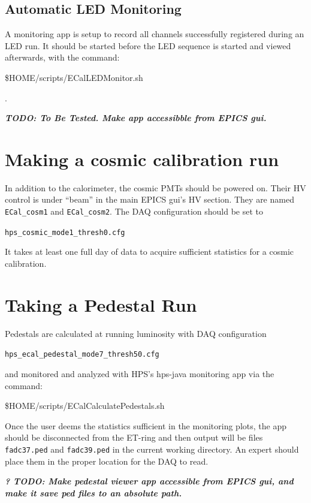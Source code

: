 \documentclass[12pt]{article}
\begin{document}
\subsection{Automatic LED Monitoring}
A monitoring app is setup to record all channels successfully registered during an LED run.  It should be started before the LED sequence is started and viewed afterwards, with the command: \begin{center}\$HOME/scripts/ECalLEDMonitor.sh\end{center}.

    {\bf \it TODO:  To Be Tested.  Make app accessibble from EPICS gui.}
      
   \section{Making a cosmic calibration run}

   In addition to the calorimeter, the cosmic PMTs should be powered on.  Their HV control is under ``beam'' in the main EPICS gui's HV section.  They are named \texttt{ECal\_cosm1} and \texttt{ECal\_cosm2}.  The DAQ configuration should be set to \begin{center}\texttt{hps\_cosmic\_mode1\_thresh0.cfg}\end{center}  It takes at least one full day of data to acquire sufficient statistics for a cosmic calibration.

   \section{Taking a Pedestal Run}

   Pedestals are calculated at running luminosity with DAQ configuration \begin{center}\texttt{hps\_ecal\_pedestal\_mode7\_thresh50.cfg}\end{center} and monitored and analyzed with HPS's hps-java monitoring app via the command:
   \begin{center}\$HOME/scripts/ECalCalculatePedestals.sh\end{center}
Once the user deems the statistics sufficient in the monitoring plots, the app should be disconnected from the ET-ring and then output will be files \texttt{fadc37.ped} and \texttt{fadc39.ped} in the current working directory.  An expert should place them in the proper location for the DAQ to read.

{\bf\it ? TODO: Make pedestal viewer app accessible from EPICS gui, and make it save ped files to an absolute path.}
\end{document}
